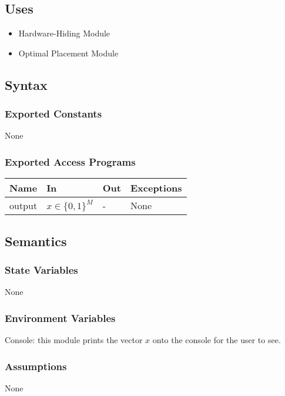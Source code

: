 \documentclass[12pt, titlepage]{article}
\begin{document}
\subsection{Uses}
\begin{itemize}
  \item Hardware-Hiding Module
  \item Optimal Placement Module 
\end{itemize}

\subsection{Syntax}

\subsubsection{Exported Constants}
None 

\subsubsection{Exported Access Programs}
\begin{center}
\begin{tabular}{p{3cm} p{4cm} p{4cm} p{3cm}}
\hline
\textbf{Name} & \textbf{In} & \textbf{Out} & \textbf{Exceptions} \\
\hline
output & $x \in \{0,1\}^M$  & - & None \\
\hline
\end{tabular}
\end{center}

\subsection{Semantics}

\subsubsection{State Variables}
None

\subsubsection{Environment Variables}
Console: this module prints the vector $x$ onto the console for the user to see.

\subsubsection{Assumptions}
None
\end{document}
